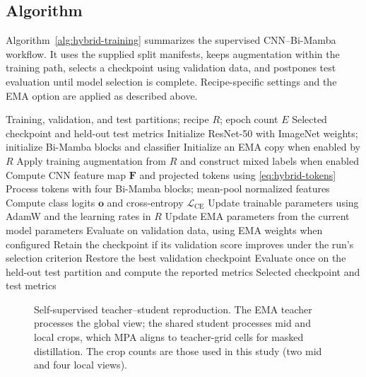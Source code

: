 \documentclass[conference]{IEEEtran}
\begin{document}
\subsection{Algorithm}
Algorithm~\ref{alg:hybrid-training} summarizes the supervised CNN--Bi-Mamba workflow. It uses the supplied split manifests, keeps augmentation within the training path, selects a checkpoint using validation data, and postpones test evaluation until model selection is complete. Recipe-specific settings and the EMA option are applied as described above.
\begin{algorithm}[t]
\caption{CNN--Bi-Mamba Training and Evaluation}
\label{alg:hybrid-training}
\begin{algorithmic}[1]
\REQUIRE Training, validation, and test partitions; recipe $R$; epoch count $E$
\ENSURE Selected checkpoint and held-out test metrics
\STATE Initialize ResNet-50 with ImageNet weights; initialize Bi-Mamba blocks and classifier
\STATE Initialize an EMA copy when enabled by $R$
        \STATE Apply training augmentation from $R$ and construct mixed labels when enabled
        \STATE Compute CNN feature map $\mathbf{F}$ and projected tokens using \eqref{eq:hybrid-tokens}
        \STATE Process tokens with four Bi-Mamba blocks; mean-pool normalized features
        \STATE Compute class logits $\mathbf{o}$ and cross-entropy $\mathcal{L}_{\mathrm{CE}}$
        \STATE Update trainable parameters using AdamW and the learning rates in $R$
            \STATE Update EMA parameters from the current model parameters
        \ENDIF
    \ENDFOR
    \STATE Evaluate on validation data, using EMA weights when configured
    \STATE Retain the checkpoint if its validation score improves under the run's selection criterion
\ENDFOR
\STATE Restore the best validation checkpoint
\STATE Evaluate once on the held-out test partition and compute the reported metrics
\RETURN Selected checkpoint and test metrics
\end{algorithmic}
\end{algorithm}

\begin{figure}[t]
\centering
\SelfSupervisedDiagram
\caption{Self-supervised teacher--student reproduction. The EMA teacher processes the global view; the shared student processes mid and local crops, which MPA aligns to teacher-grid cells for masked distillation. The crop counts are those used in this study (two mid and four local views).}
\label{fig:ssl}
\end{figure}
\end{document}
